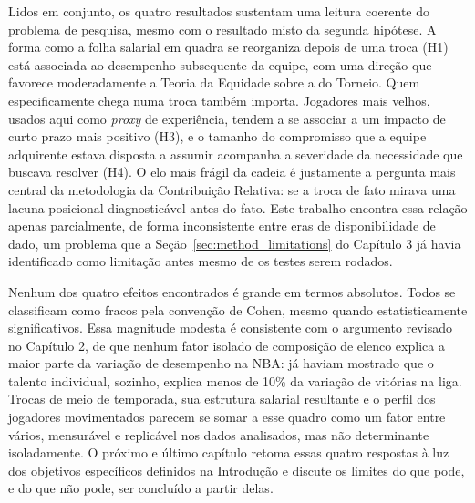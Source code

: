 Lidos em conjunto, os quatro resultados sustentam uma leitura coerente do problema de pesquisa, mesmo com o resultado misto da segunda hipótese. A forma como a folha salarial em quadra se reorganiza depois de uma troca (H1) está associada ao desempenho subsequente da equipe, com uma direção que favorece moderadamente a Teoria da Equidade sobre a do Torneio. Quem especificamente chega numa troca também importa. Jogadores mais velhos, usados aqui como \textit{proxy} de experiência, tendem a se associar a um impacto de curto prazo mais positivo (H3), e o tamanho do compromisso que a equipe adquirente estava disposta a assumir acompanha a severidade da necessidade que buscava resolver (H4). O elo mais frágil da cadeia é justamente a pergunta mais central da metodologia da Contribuição Relativa: se a troca de fato mirava uma lacuna posicional diagnosticável antes do fato. Este trabalho encontra essa relação apenas parcialmente, de forma inconsistente entre eras de disponibilidade de dado, um problema que a Seção~\ref{sec:method_limitations} do Capítulo 3 já havia identificado como limitação antes mesmo de os testes serem rodados.

Nenhum dos quatro efeitos encontrados é grande em termos absolutos. Todos se classificam como fracos pela convenção de Cohen, mesmo quando estatisticamente significativos. Essa magnitude modesta é consistente com o argumento revisado no Capítulo 2, de que nenhum fator isolado de composição de elenco explica a maior parte da variação de desempenho na NBA: \citet{berrischmidt2010} já haviam mostrado que o talento individual, sozinho, explica menos de 10\% da variação de vitórias na liga. Trocas de meio de temporada, sua estrutura salarial resultante e o perfil dos jogadores movimentados parecem se somar a esse quadro como um fator entre vários, mensurável e replicável nos dados analisados, mas não determinante isoladamente. O próximo e último capítulo retoma essas quatro respostas à luz dos objetivos específicos definidos na Introdução e discute os limites do que pode, e do que não pode, ser concluído a partir delas.
